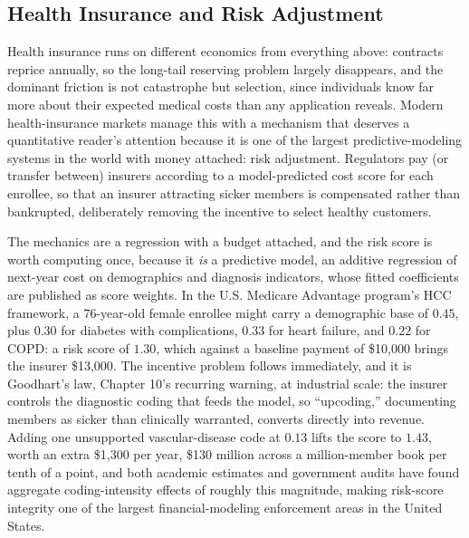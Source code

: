 \documentclass[../ai_in_finance]{subfiles}
\begin{document}
\subsection{Health Insurance and Risk Adjustment}
\label{sec:ins-health}

Health insurance runs on different economics from everything above: contracts reprice annually, so the long-tail reserving problem largely disappears, and the dominant friction is not catastrophe but selection, since individuals know far more about their expected medical costs than any application reveals. Modern health-insurance markets manage this with a mechanism that deserves a quantitative reader's attention because it is one of the largest predictive-modeling systems in the world with money attached: risk adjustment. Regulators pay (or transfer between) insurers according to a model-predicted cost score for each enrollee, so that an insurer attracting sicker members is compensated rather than bankrupted, deliberately removing the incentive to select healthy customers.

The mechanics are a regression with a budget attached, and the risk score is worth computing once, because it \emph{is} a predictive model, an additive regression of next-year cost on demographics and diagnosis indicators, whose fitted coefficients are published as score weights. In the U.S. Medicare Advantage program's HCC framework, a 76-year-old female enrollee might carry a demographic base of $0.45$, plus $0.30$ for diabetes with complications, $0.33$ for heart failure, and $0.22$ for COPD: a risk score of $1.30$, which against a baseline payment of \$10{,}000 brings the insurer \$13{,}000. The incentive problem follows immediately, and it is Goodhart's law, Chapter 10's recurring warning, at industrial scale: the insurer controls the diagnostic coding that feeds the model, so ``upcoding,'' documenting members as sicker than clinically warranted, converts directly into revenue. Adding one unsupported vascular-disease code at $0.13$ lifts the score to $1.43$, worth an extra \$1{,}300 per year, \$130 million across a million-member book per tenth of a point, and both academic estimates and government audits have found aggregate coding-intensity effects of roughly this magnitude, making risk-score integrity one of the largest financial-modeling enforcement areas in the United States.
\end{document}
